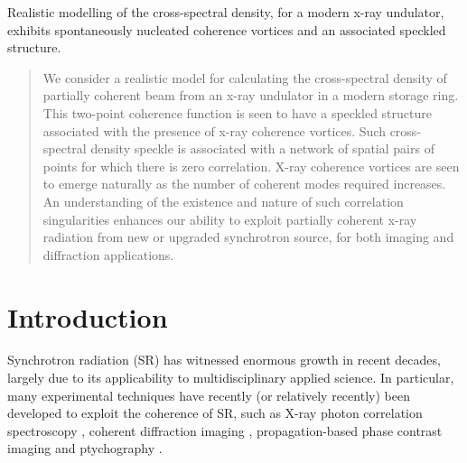 \documentclass{iucr}              %
\begin{document}
\maketitle                        %

\begin{synopsis}
Realistic modelling of the cross-spectral density, for a modern x-ray undulator, exhibits spontaneously nucleated coherence vortices and an associated speckled structure.
\end{synopsis}

\begin{abstract}
We consider a realistic model for calculating the cross-spectral density of partially coherent beam from an x-ray undulator in a modern storage ring.  This two-point coherence function is seen to have a speckled structure associated with the presence of x-ray coherence vortices.  Such cross-spectral density speckle is associated with a network of spatial pairs of points for which there is zero correlation.  X-ray coherence vortices are seen to emerge naturally as the number of coherent modes required increases.  An understanding of the existence and nature of such correlation singularities enhances our ability to exploit partially coherent x-ray radiation from new or upgraded synchrotron source, for both imaging and diffraction applications.
\end{abstract}


\section{Introduction}

Synchrotron radiation (SR) has witnessed enormous growth in recent decades, largely due to its applicability to multidisciplinary applied science. In particular, many experimental techniques have recently (or relatively recently) been developed to exploit the coherence of SR, such as X-ray photon correlation spectroscopy \cite{XPCS}, coherent diffraction imaging \cite{CDI}, propagation-based phase contrast imaging \cite{PBPCI} and ptychography \cite{Ptychography}. 
\end{document}
